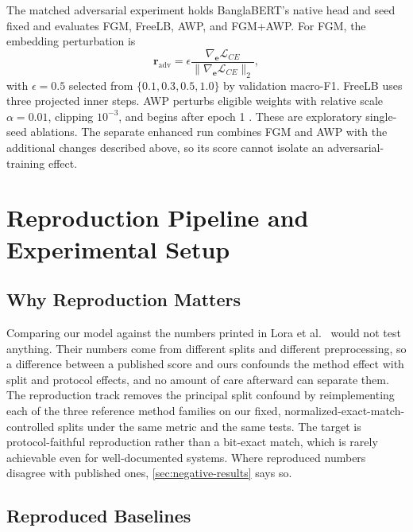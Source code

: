 \documentclass{ieeeaccess}
\begin{document}
The matched adversarial experiment holds BanglaBERT's native head and seed fixed and evaluates FGM, FreeLB, AWP, and FGM+AWP. For FGM, the embedding perturbation is
\begin{equation}
\mathbf{r}_{\mathrm{adv}}=\epsilon\frac{\nabla_{\mathbf e}\mathcal L_{CE}}{\|\nabla_{\mathbf e}\mathcal L_{CE}\|_2},
\label{eq:fgm-radv}
\end{equation}
with $\epsilon=0.5$ selected from $\{0.1,0.3,0.5,1.0\}$ by validation macro-F1. FreeLB uses three projected inner steps. AWP perturbs eligible weights with relative scale $\alpha=0.01$, clipping $10^{-3}$, and begins after epoch 1 \cite{wu2020awp}. These are exploratory single-seed ablations. The separate enhanced run combines FGM and AWP with the additional changes described above, so its score cannot isolate an adversarial-training effect.

\section{Reproduction Pipeline and Experimental Setup}
\label{sec:setup}

\subsection{Why Reproduction Matters}
\label{sec:why-repro}

Comparing our model against the numbers printed in Lora et al.\ \cite{lora2025bensarc} would not test anything. Their numbers come from different splits and different preprocessing, so a difference between a published score and ours confounds the method effect with split and protocol effects, and no amount of care afterward can separate them. The reproduction track removes the principal split confound by reimplementing each of the three reference method families on our fixed, normalized-exact-match-controlled splits under the same metric and the same tests. The target is protocol-faithful reproduction rather than a bit-exact match, which is rarely achievable even for well-documented systems. Where reproduced numbers disagree with published ones, \cref{sec:negative-results} says so.

\subsection{Reproduced Baselines}
\label{sec:reproduced-baselines}
\end{document}
